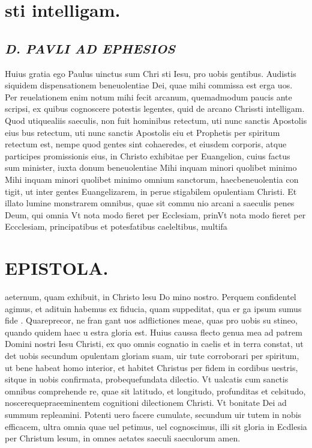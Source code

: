 \documentclass{article}
\begin{document}
\begin{pages}
\section*{sti intelligam. }
\marginpar{[ p.1. ]}
{}
\subsection*{\textit{D. PAVLI AD EPHESIOS }}\pstart Huius gratia ego Paulus uinctus sum Chri sti Iesu, pro uobis gentibus.  Audistis siquidem dispensationem beneuolentiae Dei, quae mihi commissa est erga uos. Per reuelationem enim notum mihi fecit arcanum, quemadmodum paucis ante scripsi, ex quibus  cognoscere potestis legentes, quid de arcano Chrissti intelligam.  \pend\pstart Quod utiquealiis saeculis, non fuit hominibus retectum, uti nunc sanctis Apostolis eius bus retectum, uti nunc sanctis Apostolis eiu et Prophetis per spiritum retectum est, nempe quod gentes sint cohaeredes, et eiusdem corporis, atque participes promissionis eius, in Christo exhibitae per Euangelion, cuius factus sum minister, iuxta donum beneuolentiae  \pend\pstart Mihi inquam minori quolibet minimo Mihi inquam minori quolibet minimo omnium sanctorum, haecbeneuolentia con tigit, ut inter gentes Euangelizarem, in perue stigabilem opulentiam Christi. Et illato lumine monstrarem omnibus, quae sit commu nio arcani a saeculis penes Deum, qui omnia  \pend\pstart Vt nota modo fieret per Ecclesiam, prinVt nota modo fieret per Eccclesiam, principatibus et potesfatibus caeleltibus, multifa\pend
\section*{EPISTOLA.  }
\marginpar{[ p.12 ]}
\marginpar{[ p.5.  ]}
\marginpar{[ p.6.  ]}
\marginpar{[ p.7. ]}
\marginpar{[ p.8. ]}
\marginpar{[ p.9. ]}\pstart aeternum, quam exhibuit, in Christo lesu Do mino nostro.  \pend\pstart Perquem confidentel agimus, et adituin habemus ex fiducia, quam suppeditat, qua er ga ipsum sumus fide . Quareprecor, ne fran gant uos adflictiones meae, quas pro uobis su stineo, quando quidem haec u estra gloria est.  \pend\pstart Huius caussa flecto genua mea ad patrem Domini nostri Iesu Christi, ex quo omnis cognatio in caelis et in terra constat, ut det uobis secundum opulentam gloriam suam, uir tute corroborari per spiritum, ut bene habeat homo interior, et habitet Christus per fidem in cordibus uestris, sitque in uobis confirmata, probequefundata dilectio.  \pend\pstart Vt ualcatis cum sanctis omnibus comprehende re, quae sit latitudo, et longitudo, profunditas et celsitudo, noscerequepraeeminentem cognitioni dilectionem Christi. Vt bonitate Dei ad summum repleamini.  \pend\pstart Potenti uero facere cumulate, secundum uir tutem in nobis efficacem, ultra omnia quae uel petimus, uel cognoscimus, illi sit gloria in Ecdlesia per Christum lesum, in omnes aetates saeculi saeculorum amen.  \pend

\end{pages}
\end{document}
